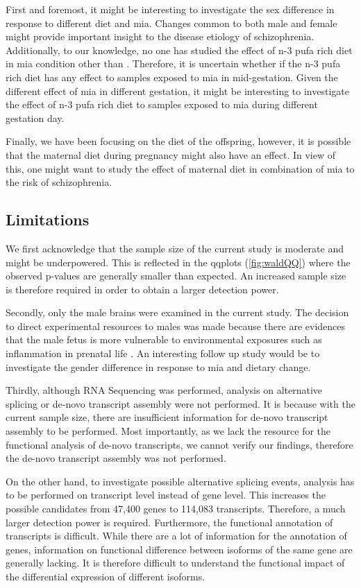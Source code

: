 \documentclass[12pt]{scrbook}
\newcommand*{\scz}{schizophrenia}
\begin{document}
First and foremost, it might be interesting to investigate the sex difference in response to different diet and \gls{mia}.
Changes common to both male and female might provide important insight to the disease etiology of \scz.
Additionally, to our knowledge, no one has studied the effect of n-3 \gls{pufa} rich diet in \gls{mia} condition other than \citet{Li2015}.
Therefore, it is uncertain whether if the n-3 \gls{pufa} rich diet has any effect to samples exposed to \gls{mia} in mid-gestation.
Given the different effect of \gls{mia} in different gestation, it might be interesting to investigate the effect of n-3 \gls{pufa} rich diet to samples exposed to \gls{mia} during different gestation day.

Finally, we have been focusing on the diet of the offspring, however, it is possible that the maternal diet during pregnancy might also have an effect.
In view of this, one might want to study the effect of maternal diet in combination of \gls{mia} to the risk of \scz.

\subsection{Limitations}
We first acknowledge that the sample size of the current study is moderate and might be underpowered.
This is reflected in the \glspl{qqplot} (\cref{fig:waldQQ}) where the observed p-values are generally smaller than expected.
An increased sample size is therefore required in order to obtain a larger detection power. 

Secondly, only the male brains were examined in the current study. 
The decision to direct experimental resources to males was made because there are evidences that the male fetus is more vulnerable to environmental exposures such as inflammation in prenatal life \citep{Bergeron2013,Lein2007}. 
An interesting follow up study would be to investigate the gender difference in response to \gls{mia} and dietary change.

Thirdly, although RNA Sequencing was performed, analysis on alternative splicing or de-novo transcript assembly were not performed.
It is because with the current sample size, there are insufficient information for de-novo transcript assembly to be performed. 
Most importantly, as we lack the resource for the functional analysis of de-novo transcripts, we cannot verify our findings, therefore the de-novo transcript assembly was not performed. 

On the other hand, to investigate possible alternative splicing events, analysis has to be performed on transcript level instead of gene level. 
This increases the possible candidates from 47,400 genes to 114,083 transcripts.
Therefore, a much larger detection power is required. 
Furthermore, the functional annotation of transcripts is difficult.
While there are a lot of information for the annotation of genes, information on functional difference between isoforms of the same gene are generally lacking. 
It is therefore difficult to understand the functional impact of the differential expression of different isoforms. 
\end{document}

